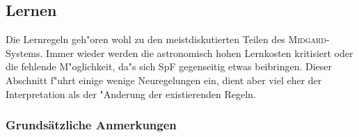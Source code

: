 \documentclass[10pt,a4paper,germanpar]{article}
\begin{document}
% 

\subsection{Lernen}
\label{lernen}

Die Lernregeln geh"oren wohl zu den meistdiskutierten Teilen des
\textsc{Midgard}-Systems. Immer wieder werden die astronomisch hohen
Lernkosten kritisiert oder die fehlende M"oglichkeit, da"s sich SpF
gegenseitig etwas beibringen. Dieser Abschnitt f"uhrt einige wenige
Neuregelungen ein, dient aber viel eher der Interpretation als der
"Anderung der existierenden Regeln.

\subsubsection{Grundsätzliche Anmerkungen}
\end{document}
